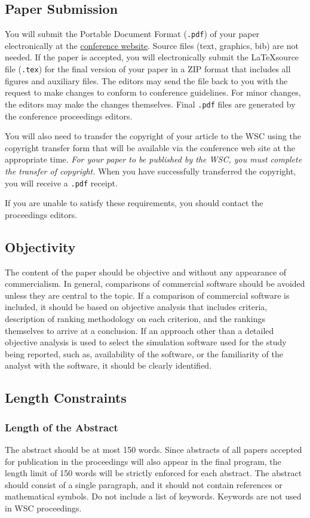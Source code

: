 \documentclass{wscpaperproc}
\theoremstyle{wsc}
\begin{document}
\subsection{Paper Submission}
You will submit the Portable Document Format ({\tt .pdf}) of your paper electronically at the \href{http://www.wintersim.org}{conference website}. Source files (text, graphics, bib) are not needed. If the paper is accepted, you will electronically submit the \LaTeX source file ({\tt .tex}) for the final version of your paper in a ZIP format that includes all figures and auxiliary files.
The editors may send the file back to you with the request to make changes to conform to conference guidelines. For minor changes, the editors may make the changes themselves. Final {\tt .pdf} files are generated by the conference proceedings editors.

You will also need to transfer the copyright of your article to the WSC using the copyright transfer form that will be available via the conference web site at the appropriate time. {\em For your paper to be published by the WSC, you must complete the transfer of copyright.}
When you have successfully transferred the copyright, you will receive a {\tt .pdf} receipt.

If you are unable to satisfy these requirements, you should contact the proceedings editors.

\subsection{Objectivity}
The content of the paper should be objective and without any appearance of commercialism. In general, comparisons of commercial software should be avoided unless they are central to the topic. If a comparison of commercial software is included, it should be based on objective analysis that includes criteria, description of ranking methodology on each criterion, and the rankings themselves to arrive at a conclusion. If an approach other than a detailed objective analysis is used to select the simulation software used for the study being reported, such as, availability of the software, or the familiarity of the analyst with the software, it should be clearly identified.

\subsection{Length Constraints}

\subsubsection{Length of the Abstract}
The abstract should be at most 150 words. Since abstracts of all papers accepted for publication in the proceedings will also appear in the final program, the length limit of 150 words will be strictly enforced for each abstract. The abstract should consist of a single paragraph, and it should not contain references or mathematical symbols. Do not include a list of keywords. Keywords are not used in WSC proceedings.
\end{document}
